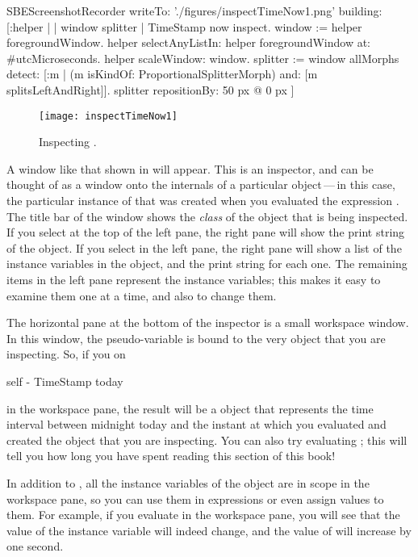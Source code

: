 \documentclass[a4paper,10pt,twoside]{book}
\begin{document}
\begin{ExecuteSmalltalkScript}
SBEScreenshotRecorder writeTo: './figures/inspectTimeNow1.png' building: [:helper | | window splitter |
	TimeStamp now inspect.
	window := helper foregroundWindow.
	helper selectAnyListIn: helper foregroundWindow at: #utcMicroseconds.
	helper scaleWindow: window.
	splitter := window allMorphs detect: [:m |
		(m isKindOf: ProportionalSplitterMorph) and: [m splitsLeftAndRight]].
	splitter repositionBy: 50 px @ 0 px
]
\end{ExecuteSmalltalkScript}
\begin{figure}[btp]
	\begin{center}
		\texttt{[image: inspectTimeNow1]}
	\end{center}
	\caption{Inspecting .}
	\label{fig:inspectTimeNow1}
\end{figure}

A window like that shown in  will appear.
This is an inspector, and can be thought of as a window onto the internals of a particular object\,---\,in this case, the particular instance of  that was created when you evaluated the expression .
The title bar of the window shows the \emph{class} of the object that is being inspected.
If you select  at the top of the left pane, the right pane will show the print string of the object.
If you select  in the left pane, the right pane will show a list of the instance variables in the object, and the print string for each one.
The remaining items in the left pane represent the instance variables; this makes it easy to examine them one at a time, and also to change them.

The horizontal pane at the bottom of the inspector is a small workspace window.
In this window, the pseudo-variable  is bound to the very object that you are inspecting.
So, if you  on
\begin{code}{}
self - TimeStamp today
\end{code}
in the workspace pane, the result will be a  object that represents the time interval between midnight today and the instant at which you evaluated  and created the  object that you are inspecting.
You can also try evaluating ; this will tell you how long you have spent reading this section of this book!

In addition to , all the instance variables of the object are in scope in the workspace pane, so you can use them in expressions or even assign values to them.
For example, if you evaluate  in the workspace pane, you will see that the value of the  instance variable will indeed change, and the value of  will increase by one second.
\end{document}
